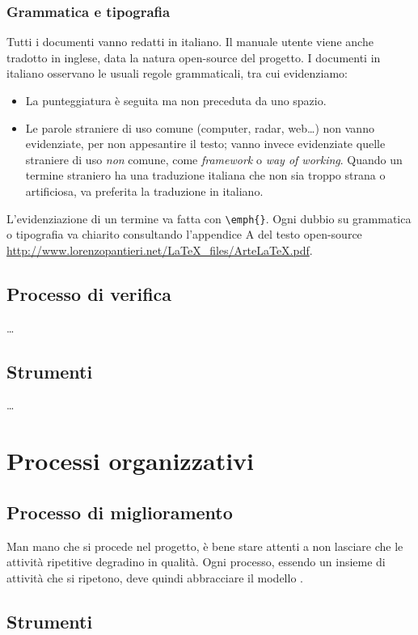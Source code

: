 \subsubsection{Grammatica e tipografia} Tutti i documenti vanno redatti in italiano. Il manuale utente viene anche tradotto in inglese, data la natura open-source del progetto. I documenti in italiano osservano le usuali regole grammaticali, tra cui evidenziamo:
\begin{itemize}
	\item La punteggiatura è seguita ma non preceduta da uno spazio.
	\item Le parole straniere di uso comune (computer, radar, web\dots) non vanno evidenziate, per non appesantire il testo; vanno invece evidenziate quelle straniere di uso \emph{non} comune, come \emph{framework} o \emph{way of working}. Quando un termine straniero ha una traduzione italiana che non sia troppo strana o artificiosa, va preferita la traduzione in italiano.
\end{itemize}
L'evidenziazione di un termine va fatta con \texttt{\textbackslash emph\{\}}. Ogni dubbio su grammatica o tipografia va chiarito consultando l'appendice A del testo open-source \url{http://www.lorenzopantieri.net/LaTeX_files/ArteLaTeX.pdf}.



\subsection{Processo di verifica} \dots

\subsection{Strumenti} \dots

\section{Processi organizzativi}

\subsection{Processo di miglioramento} %
Man mano che si procede nel progetto, è bene stare attenti a non lasciare che le attività ripetitive degradino in qualità. Ogni processo, essendo un insieme di attività che si ripetono, deve quindi abbracciare il modello . %

\subsection{Strumenti}


